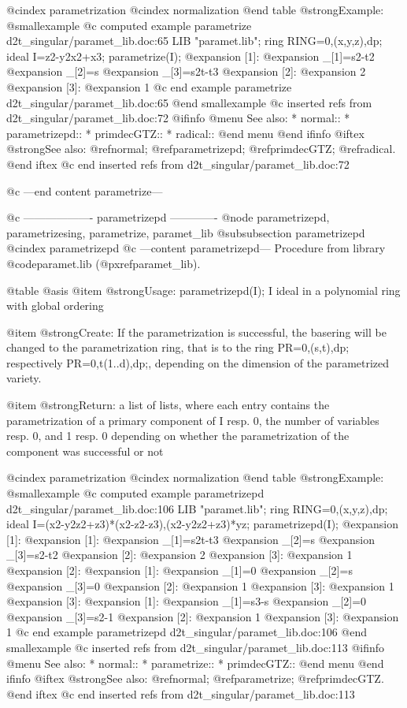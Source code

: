 @cindex parametrization
@cindex normalization
@end table
@strong{Example:}
@smallexample
@c computed example parametrize d2t_singular/paramet_lib.doc:65 
LIB "paramet.lib";
ring RING=0,(x,y,z),dp;
ideal I=z2-y2x2+x3;
parametrize(I);
@expansion{} [1]:
@expansion{}    _[1]=s2-t2
@expansion{}    _[2]=s
@expansion{}    _[3]=s2t-t3
@expansion{} [2]:
@expansion{}    2
@expansion{} [3]:
@expansion{}    1
@c end example parametrize d2t_singular/paramet_lib.doc:65
@end smallexample
@c inserted refs from d2t_singular/paramet_lib.doc:72
@ifinfo
@menu
See also:
* normal::
* parametrizepd::
* primdecGTZ::
* radical::
@end menu
@end ifinfo
@iftex
@strong{See also:}
@ref{normal};
@ref{parametrizepd};
@ref{primdecGTZ};
@ref{radical}.
@end iftex
@c end inserted refs from d2t_singular/paramet_lib.doc:72

@c ---end content parametrize---

@c ------------------- parametrizepd -------------
@node parametrizepd, parametrizesing, parametrize, paramet_lib
@subsubsection parametrizepd
@cindex parametrizepd
@c ---content parametrizepd---
Procedure from library @code{paramet.lib} (@pxref{paramet_lib}).

@table @asis
@item @strong{Usage:}
parametrizepd(I); I ideal in a polynomial ring with global ordering

@item @strong{Create:}
If the parametrization is successful, the basering will be changed to
the parametrization ring, that is to the ring PR=0,(s,t),dp;
respectively PR=0,t(1..d),dp;, depending on the dimension of the
parametrized variety.

@item @strong{Return:}
a list of lists, where each entry contains the parametrization
of a primary component of I resp. 0, the number of variables
resp. 0, and 1 resp. 0 depending on whether the parametrization
of the component was successful or not

@cindex parametrization
@cindex normalization
@end table
@strong{Example:}
@smallexample
@c computed example parametrizepd d2t_singular/paramet_lib.doc:106 
LIB "paramet.lib";
ring RING=0,(x,y,z),dp;
ideal I=(x2-y2z2+z3)*(x2-z2-z3),(x2-y2z2+z3)*yz;
parametrizepd(I);
@expansion{} [1]:
@expansion{}    [1]:
@expansion{}       _[1]=s2t-t3
@expansion{}       _[2]=s
@expansion{}       _[3]=s2-t2
@expansion{}    [2]:
@expansion{}       2
@expansion{}    [3]:
@expansion{}       1
@expansion{} [2]:
@expansion{}    [1]:
@expansion{}       _[1]=0
@expansion{}       _[2]=s
@expansion{}       _[3]=0
@expansion{}    [2]:
@expansion{}       1
@expansion{}    [3]:
@expansion{}       1
@expansion{} [3]:
@expansion{}    [1]:
@expansion{}       _[1]=s3-s
@expansion{}       _[2]=0
@expansion{}       _[3]=s2-1
@expansion{}    [2]:
@expansion{}       1
@expansion{}    [3]:
@expansion{}       1
@c end example parametrizepd d2t_singular/paramet_lib.doc:106
@end smallexample
@c inserted refs from d2t_singular/paramet_lib.doc:113
@ifinfo
@menu
See also:
* normal::
* parametrize::
* primdecGTZ::
@end menu
@end ifinfo
@iftex
@strong{See also:}
@ref{normal};
@ref{parametrize};
@ref{primdecGTZ}.
@end iftex
@c end inserted refs from d2t_singular/paramet_lib.doc:113

